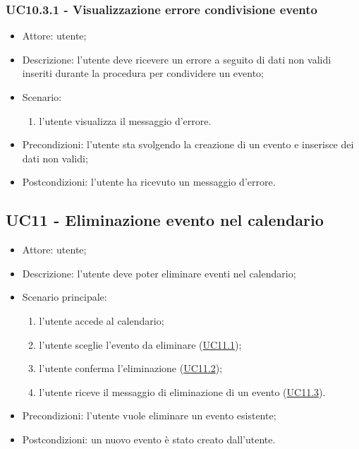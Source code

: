 \subsubsection{UC10.3.1 - Visualizzazione errore condivisione evento} \label{sec: UC10.3.1}
\begin{itemize}
    \item Attore: utente;
    \item Descrizione: l'utente deve ricevere un errore a seguito di dati non validi inseriti durante la procedura per condividere un evento;
    \item Scenario:
        \begin{enumerate}
        \item l'utente visualizza il messaggio d'errore.
        \end{enumerate}
    
    \item Precondizioni: l'utente sta svolgendo la creazione di un evento e inserisce dei dati non validi;
    \item Postcondizioni: l'utente ha ricevuto un messaggio d'errore.
\end{itemize}


\subsection{UC11 - Eliminazione evento nel calendario}
\begin{itemize}
    \item Attore: utente;
    \item Descrizione: l'utente deve poter eliminare eventi nel calendario;
    \item Scenario principale:
        \begin{enumerate}
        \item l'utente accede al calendario;
        \item l'utente sceglie l'evento da eliminare (\hyperref[sec: UC11.1]{UC11.1});
        \item l'utente conferma l'eliminazione (\hyperref[sec: UC11.2]{UC11.2});
        \item l'utente riceve il messaggio di eliminazione di un evento (\hyperref[sec: UC11.3]{UC11.3}).
        \end{enumerate}
    \item Precondizioni: l'utente vuole eliminare un evento esistente;
    \item Postcondizioni: un nuovo evento è stato creato dall'utente.
\end{itemize}

